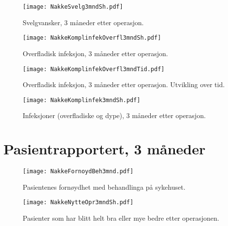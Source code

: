 \documentclass[presentation,xcolor=pdftex,dvipsnames,table]{beamer}\usepackage[]{graphicx}\usepackage[]{color}
\begin{document}
\begin{tiny}
\begin{frame}[fragile]
\begin{figure}[ht]
\centering
\texttt{[image: NakkeSvelg3mndSh.pdf]}
\caption{Svelgvansker, 3 måneder etter operasjon. }
\end{figure}
\end{frame}


\begin{frame}[fragile]
\begin{figure}[ht]
\centering
\texttt{[image: NakkeKomplinfekOverfl3mndSh.pdf]}
\caption{Overfladisk infeksjon, 3 måneder etter operasjon. }
\end{figure}
\end{frame}

\begin{frame}[fragile]
\begin{figure}[ht]
\centering
\texttt{[image: NakkeKomplinfekOverfl3mndTid.pdf]}
\caption{Overfladisk infeksjon, 3 måneder etter operasjon. Utvikling over tid. }
\end{figure}
\end{frame}


\begin{frame}[fragile]
\begin{figure}[ht]
\centering
\texttt{[image: NakkeKomplinfek3mndSh.pdf]}
\caption{Infeksjoner (overfladiske og dype), 3 måneder etter operasjon. }
\end{figure}
\end{frame}


\section{Pasientrapportert, 3 måneder}

\begin{frame}[fragile]
\begin{figure}[ht]
\centering
\texttt{[image: NakkeFornoydBeh3mnd.pdf]}
\caption{Pasientenes fornøydhet med behandlinga på sykehuset. }
\end{figure}
\end{frame}

\begin{frame}[fragile]
\begin{figure}[ht]
\centering
\texttt{[image: NakkeNytteOpr3mndSh.pdf]}
\caption{Pasienter som har blitt helt bra eller mye bedre etter operasjonen. }
\end{figure}
\end{frame}


\end{tiny}
\end{document}

